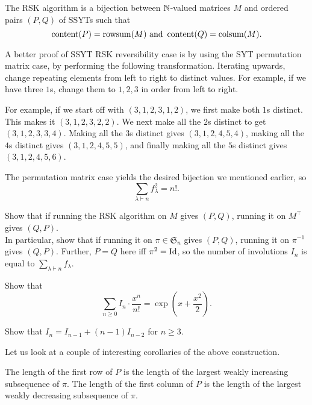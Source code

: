 	\begin{ftheo}
		The RSK algorithm is a bijection between $\mathbb{N}$-valued matrices $M$ and ordered pairs $(P,Q)$ of SSYTs such that
		\[ \operatorname{content}(P) = \operatorname{rowsum}(M) \text{ and } \operatorname{content}(Q) = \operatorname{colsum}(M). \] 
	\end{ftheo}

	A better proof of SSYT RSK reversibility case is by using the SYT permutation matrix case, by performing the following transformation. Iterating upwards, change repeating elements from left to right to distinct values. For example, if we have three $1$s, change them to $1,2,3$ in order from left to right.\\
	\begin{fex}
		For example, if we start off with $(3,1,2,3,1,2)$, we first make both $1$s distinct. This makes it $(3,1,2,3,2,2)$. We next make all the $2$s distinct to get $(3,1,2,3,3,4)$. Making all the $3$s distinct gives $(3,1,2,4,5,4)$, making all the $4$s distinct gives $(3,1,2,4,5,5)$, and finally making all the $5$s distinct gives $(3,1,2,4,5,6)$.
	\end{fex}


	The permutation matrix case yields the desired bijection we mentioned earlier, so
	\[ \sum_{\lambda \vdash n} f_\lambda^2 = n!. \]

	\begin{exercise}
		Show that if running the RSK algorithm on $M$ gives $(P,Q)$, running it on $M^\top$ gives $(Q,P)$.\\
		In particular, show that if running it on $\pi \in \mathfrak{S}_n$ gives $(P,Q)$, running it on $\pi^{-1}$ gives $(Q,P)$. Further, $P = Q$ here iff $\pi^2 = \operatorname{Id}$, so the number of involutions $I_n$ is equal to $\sum_{\lambda \vdash n} f_\lambda$.
	\end{exercise}

	\begin{exercise}
		Show that
		\[ \sum_{n \ge 0} I_n \cdot \frac{x^n}{n!} = \exp\left( x + \frac{x^2}{2} \right). \]
	\end{exercise}
	\begin{exercise}
		Show that $I_n = I_{n-1} + (n-1) I_{n-2}$ for $n \ge 3$.
	\end{exercise}

	Let us look at a couple of interesting corollaries of the above construction.
	\begin{theorem}[Schenstead]
		The length of the first row of $P$ is the length of the largest weakly increasing subsequence of $\pi$. The length of the first column of $P$ is the length of the largest weakly decreasing subsequence of $\pi$.
	\end{theorem}

